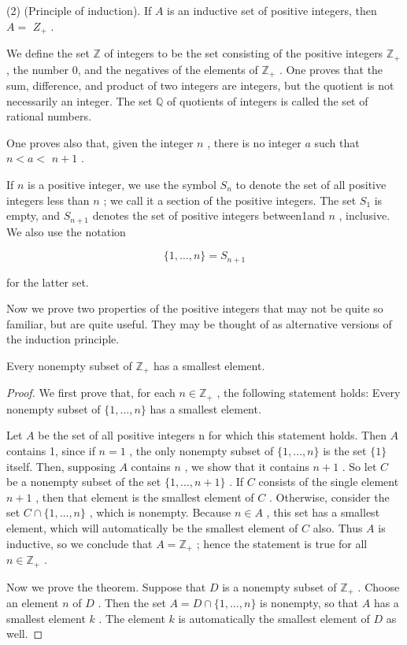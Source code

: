 (2) (Principle of induction). If \(A\) is an inductive set of positive integers, then \(A =\)  \({Z}_{ + }\) .

We define the set \(\mathbb{Z}\) of integers to be the set consisting of the positive integers \({\mathbb{Z}}_{ + }\) , the number 0, and the negatives of the elements of \({\mathbb{Z}}_{ + }\) . One proves that the sum, difference, and product of two integers are integers, but the quotient is not necessarily an integer. The set \(\mathbb{Q}\) of quotients of integers is called the set of rational numbers.

One proves also that, given the integer \(n\) , there is no integer \(a\) such that \(n < a <\)  \(n + 1\) .

If \(n\) is a positive integer, we use the symbol \({S}_{n}\) to denote the set of all positive integers less than \(n\) ; we call it a section of the positive integers. The set \({S}_{1}\) is empty, and \({S}_{n + 1}\) denotes the set of positive integers between1and \(n\) , inclusive. We also use the notation

\[
\{ 1,\ldots ,n\}  = {S}_{n + 1}
\]

for the latter set.

Now we prove two properties of the positive integers that may not be quite so familiar, but are quite useful. They may be thought of as alternative versions of the induction principle.

\begin{theorem} Every nonempty subset of \({\mathbb{Z}}_{ + }\) has a smallest element.
\end{theorem}
\begin{proof} We first prove that, for each \(n \in  {\mathbb{Z}}_{ + }\) , the following statement holds: Every nonempty subset of \(\{ 1,\ldots ,n\}\) has a smallest element.

Let \(A\) be the set of all positive integers \(\mathrm{n}\) for which this statement holds. Then \(A\) contains 1, since if \(n = 1\) , the only nonempty subset of \(\{ 1,\ldots ,n\}\) is the set \(\{ 1\}\) itself. Then, supposing \(A\) contains \(n\) , we show that it contains \(n + 1\) . So let \(C\) be a nonempty subset of the set \(\{ 1,\ldots ,n + 1\}\) . If \(C\) consists of the single element \(n + 1\) , then that element is the smallest element of \(C\) . Otherwise, consider the set \(C \cap  \{ 1,\ldots ,n\}\) , which is nonempty. Because \(n \in  A\) , this set has a smallest element, which will automatically be the smallest element of \(C\) also. Thus \(A\) is inductive, so we conclude that \(A = {\mathbb{Z}}_{ + }\) ; hence the statement is true for all \(n \in  {\mathbb{Z}}_{ + }\) .

Now we prove the theorem. Suppose that \(D\) is a nonempty subset of \({\mathbb{Z}}_{ + }\) . Choose an element \(n\) of \(D\) . Then the set \(A = D \cap  \{ 1,\ldots ,n\}\) is nonempty, so that \(A\) has a smallest element \(k\) . The element \(k\) is automatically the smallest element of \(D\) as well.
\end{proof}

